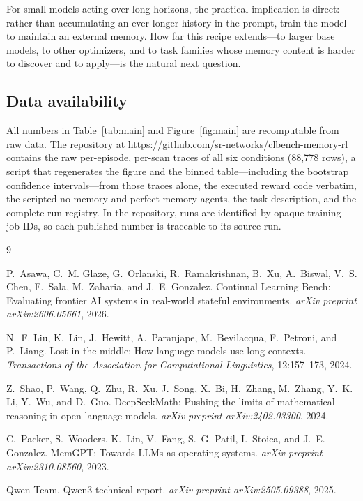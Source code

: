 \documentclass[11pt]{article}
\begin{document}
For small models acting over long horizons, the practical implication is direct:
rather than accumulating an ever longer history in the prompt, train the model to
maintain an external memory. How far this recipe extends---to larger base models,
to other optimizers, and to task families whose memory content is harder to
discover and to apply---is the natural next question.

\subsection*{Data availability}
All numbers in Table~\ref{tab:main} and Figure~\ref{fig:main} are recomputable
from raw data. The repository at
\url{https://github.com/sr-networks/clbench-memory-rl} contains the raw
per-episode, per-scan traces of all six conditions (88{,}778 rows), a script
that regenerates the figure and the binned table---including the bootstrap
confidence intervals---from those traces alone, the executed reward code
verbatim, the scripted no-memory and perfect-memory agents, the task
description, and the complete run registry. In the repository, runs are identified by opaque training-job IDs,
so each published number is traceable to its source run.

\begin{thebibliography}{9}

P.~Asawa, C.~M. Glaze, G.~Orlanski, R.~Ramakrishnan, B.~Xu, A.~Biswal,
V.~S. Chen, F.~Sala, M.~Zaharia, and J.~E. Gonzalez.
\newblock Continual Learning Bench: Evaluating frontier AI systems in
real-world stateful environments.
\newblock \emph{arXiv preprint arXiv:2606.05661}, 2026.

N.~F. Liu, K.~Lin, J.~Hewitt, A.~Paranjape, M.~Bevilacqua, F.~Petroni, and
P.~Liang.
\newblock Lost in the middle: How language models use long contexts.
\newblock \emph{Transactions of the Association for Computational Linguistics},
12:157--173, 2024.

Z.~Shao, P.~Wang, Q.~Zhu, R.~Xu, J.~Song, X.~Bi, H.~Zhang, M.~Zhang, Y.~K. Li,
Y.~Wu, and D.~Guo.
\newblock DeepSeekMath: Pushing the limits of mathematical reasoning in open
language models.
\newblock \emph{arXiv preprint arXiv:2402.03300}, 2024.

C.~Packer, S.~Wooders, K.~Lin, V.~Fang, S.~G. Patil, I.~Stoica, and
J.~E. Gonzalez.
\newblock MemGPT: Towards LLMs as operating systems.
\newblock \emph{arXiv preprint arXiv:2310.08560}, 2023.

Qwen Team.
\newblock Qwen3 technical report.
\newblock \emph{arXiv preprint arXiv:2505.09388}, 2025.

\end{thebibliography}
\end{document}
